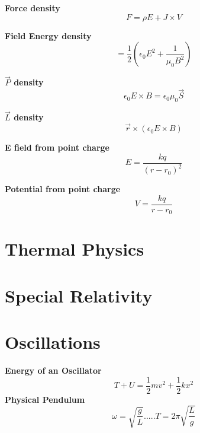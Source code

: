 \documentclass{article}
\begin{document}
{\bf{Force density}}\begin{equation}F=\rho E + J\times V\end{equation}

{\bf{Field Energy density}}\begin{equation}=\frac{1}{2} (\epsilon_0 E^2 + \frac{1}{\mu_0 B^2})\end{equation}

{\bf{$\vec{P}$ density}} \begin{equation}\epsilon_0 E \times B = \epsilon_0 \mu_0 \vec{S}\end{equation}

{\bf{$\vec{L}$ density}}\begin{equation}\vec{r}\times (\epsilon_0 E \times B)\end{equation}

{\bf{E field from point charge}}\begin{equation}E=\frac{kq}{(r-r_0)^2}\end{equation}

{\bf{Potential from point charge}}\begin{equation}V=\frac{kq}{r-r_0}\end{equation}










\section{Thermal Physics}









\section{Special Relativity}









\section{Oscillations}
{\bf{Energy of an Oscillator}}\begin{equation}T+U=\frac{1}{2}mv^2 + \frac{1}{2}kx^2\end{equation}
{\bf{Physical Pendulum}}\begin{equation}\omega = \sqrt{\frac{g}{L}}.....T=2\pi \sqrt{\frac{L}{g}}\end{equation}
\end{document}
